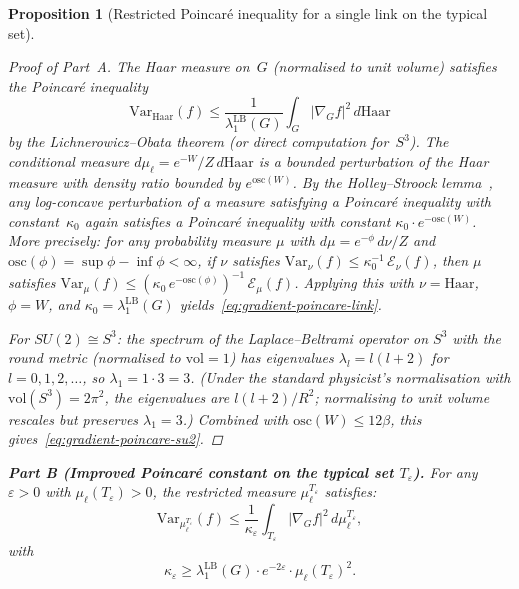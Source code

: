 \documentclass[12pt,a4paper]{article}
\theoremstyle{definition}
\theoremstyle{plain}
\newtheorem{proposition}[definition]{Proposition}
\theoremstyle{remark}
\begin{document}
\begin{proposition}[Restricted Poincar\'e inequality for a single link on the typical set]
\begin{proof}[Proof of Part~A]
The Haar measure on~$G$ (normalised to unit volume) satisfies the Poincar\'e inequality
\[
    \mathrm{Var}_{\mathrm{Haar}}(f) \leq \frac{1}{\lambda_1^{\mathrm{LB}}(G)} \int_G |\nabla_G f|^2\,d\mathrm{Haar}
\]
by the Lichnerowicz--Obata theorem (or direct computation for~$S^3$). The conditional measure $d\mu_\ell = e^{-W}/Z\,d\mathrm{Haar}$ is a bounded perturbation of the Haar measure with density ratio bounded by $e^{\mathrm{osc}(W)}$. By the Holley--Stroock lemma~\cite{HolleyStroock1987}, any log-concave perturbation of a measure satisfying a Poincar\'e inequality with constant~$\kappa_0$ again satisfies a Poincar\'e inequality with constant $\kappa_0\cdot e^{-\mathrm{osc}(W)}$. More precisely: for any probability measure $\mu$ with $d\mu = e^{-\phi}\,d\nu / Z$ and $\mathrm{osc}(\phi) = \sup\phi - \inf\phi < \infty$, if $\nu$ satisfies $\mathrm{Var}_\nu(f) \leq \kappa_0^{-1}\,\mathcal{E}_\nu(f)$, then $\mu$ satisfies $\mathrm{Var}_\mu(f) \leq (\kappa_0\,e^{-\mathrm{osc}(\phi)})^{-1}\,\mathcal{E}_\mu(f)$. Applying this with $\nu = \mathrm{Haar}$, $\phi = W$, and $\kappa_0 = \lambda_1^{\mathrm{LB}}(G)$ yields~\eqref{eq:gradient-poincare-link}.

For $SU(2) \cong S^3$: the spectrum of the Laplace--Beltrami operator on $S^3$ with the round metric (normalised to $\mathrm{vol} = 1$) has eigenvalues $\lambda_l = l(l+2)$ for $l = 0, 1, 2, \ldots$, so $\lambda_1 = 1 \cdot 3 = 3$. (Under the standard physicist's normalisation with $\mathrm{vol}(S^3) = 2\pi^2$, the eigenvalues are $l(l+2)/R^2$; normalising to unit volume rescales but preserves $\lambda_1 = 3$.) Combined with $\mathrm{osc}(W) \leq 12\beta$, this gives~\eqref{eq:gradient-poincare-su2}.
\end{proof}

\medskip
\noindent\textbf{Part B (Improved Poincar\'e constant on the typical set $T_\varepsilon$).}
For any $\varepsilon > 0$ with $\mu_\ell(T_\varepsilon) > 0$, the restricted measure $\mu_\ell^{T_\varepsilon}$ satisfies:
\begin{equation}\label{eq:restricted-poincare}
    \mathrm{Var}_{\mu_\ell^{T_\varepsilon}}(f) \leq \frac{1}{\kappa_\varepsilon}\int_{T_\varepsilon} |\nabla_G f|^2\,d\mu_\ell^{T_\varepsilon},
\end{equation}
with
\begin{equation}\label{eq:restricted-constant}
    \kappa_\varepsilon \geq \lambda_1^{\mathrm{LB}}(G)\cdot e^{-2\varepsilon}\cdot \mu_\ell(T_\varepsilon)^2.
\end{equation}


\end{proposition}
\end{document}
